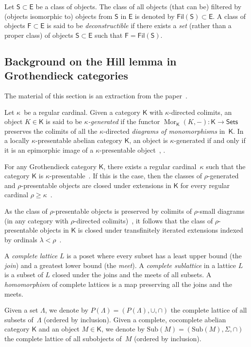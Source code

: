 \documentclass[12pt,a4paper]{amsart}
\newcommand{\+}{\protect\nobreakdash-}
\renewcommand{\:}{\colon}
\newcommand{\rarrow}{\longrightarrow}
\DeclareMathOperator{\Mor}{Mor}
\newcommand{\Sets}{\mathsf{Sets}}
\newcommand{\Fil}{\mathsf{Fil}}
\newcommand{\Sub}{\mathrm{Sub}}
\newcommand{\sE}{\mathsf E}
\newcommand{\sF}{\mathsf F}
\newcommand{\sK}{\mathsf K}
\newcommand{\sS}{\mathsf S}
\theoremstyle{plain}
\theoremstyle{definition}
\begin{document}
 Let $\sS\subset\sE$ be a class of objects.
 The class of all objects (that can be) filtered by (objects
isomorphic to) objects from $\sS$ in $\sE$ is denoted by
$\Fil(\sS)\subset\sE$.
 A class of objects $\sF\subset\sE$ is said to be
\emph{deconstructible} if there exists a \emph{set} (rather than
a proper class) of objects $\sS\subset\sE$ such that $\sF=\Fil(\sS)$.

\subsection{Background on the Hill lemma in Grothendieck categories}
\label{background-on-hill-lemma-subsecn}
 The material of this section is an extraction from
the paper~\cite{Sto0}.

 Let $\kappa$~be a regular cardinal.
 Given a category $\sK$ with $\kappa$\+directed colimits, an object
$K\in\sK$ is said to be \emph{$\kappa$\+generated} if the functor
$\Mor_\sK(K,{-})\:\sK\rarrow\Sets$ preserves the colimits of all
the $\kappa$\+directed \emph{diagrams of monomorphisms} in~$\sK$.
 In a locally $\kappa$\+presentable abelian category $\sK$,
an object is $\kappa$\+generated if and only if it is an epimorphic
image of a $\kappa$\+presentable object~\cite[Proposition~1.69]{AR},
\cite[Lemma~A.3]{Sto0}.

 For any Grothendieck category $\sK$, there exists a regular
cardinal~$\kappa$ such that the category $\sK$ is
$\kappa$\+presentable~\cite[Lemma~A.1]{Sto0}.
 If this is the case, then the classes of $\rho$\+generated
and $\rho$\+presentable objects are closed under extensions
in $\sK$ for every regular cardinal $\rho\ge\kappa$
\,\cite[Lemma~A.4]{Sto0}.

 As the class of $\rho$\+presentable objects is preserved by
colimits of $\rho$\+small diagrams (in any category with
$\rho$\+directed colimits)~\cite[Proposition~1.16]{AR}, it follows
that the class of $\rho$\+presentable objects in $\sK$ is closed
under transfinitely iterated extensions indexed by ordinals
$\lambda<\rho$ \,\cite[Corollary~A.5]{Sto0}.

 A \emph{complete lattice} $L$ is a poset where every subset has
a least upper bound (the \emph{join}) and a greatest lower bound
(the \emph{meet}).
 A \emph{complete sublattice} in a lattice $L$ is a subset of $L$
closed under the joins and the meets of all subsets.
 A \emph{homomorphism} of complete lattices is a map preserving
all the joins and the meets.

 Given a set $\Lambda$, we denote by $P(\Lambda)=
(P(\Lambda),\cup,\cap)$ the complete lattice of all subsets
of~$\Lambda$ (ordered by inclusion).
 Given a complete, cocomplete abelian category $\sK$ and an object
$M\in\sK$, we denote by $\Sub(M)=(\Sub(M),\Sigma,\cap)$ the complete
lattice of all subobjects of~$M$ (ordered by inclusion).
\end{document}
